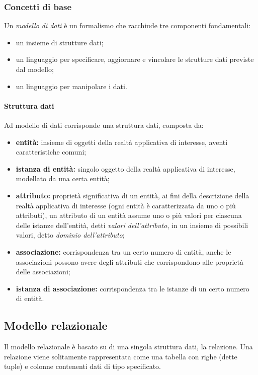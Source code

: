 \subsubsection{Concetti di base}%
\label{ssub:Concetti di base}
Un \emph{modello di dati} è un formalismo che racchiude tre componenti
fondamentali:
\begin{itemize}
  \item un insieme di strutture dati;
  \item un linguaggio per specificare, aggiornare e vincolare le strutture dati
    previste dal modello;
  \item un linguaggio per manipolare i dati.
\end{itemize}

\paragraph{Struttura dati}%
\label{par:Struttura dati}
Ad modello di dati corrisponde una struttura dati, composta da:
\begin{itemize}
  \item \textbf{entità:} insieme di oggetti della realtà applicativa di
    interesse, aventi caratteristiche comuni;
  \item \textbf{istanza di entità:} singolo oggetto della realtà applicativa di
    interesse, modellato da una certa entità;
  \item \textbf{attributo:} proprietà significativa di un entità, ai fini della
    descrizione della realtà applicativa di interesse (ogni entità è
    caratterizzata da uno o più attributi), un attributo di un entità assume uno
    o più valori per ciascuna delle istanze dell'entità, detti \textit{valori
    dell'attributo}, in un insieme di possibili valori, detto \textit{dominio
    dell'attributo};
  \item \textbf{associazione:} corrispondenza tra un certo numero di entità,
    anche le associazioni possono avere degli attributi che corrispondono alle
    proprietà delle associazioni;
  \item \textbf{istanza di associazione:} corrispondenza tra le istanze di un
    certo numero di entità.
\end{itemize}

\subsection{Modello relazionale}%
\label{par:Modello relazionale}
Il modello relazionale è basato su di una singola struttura dati, la relazione.
Una relazione viene solitamente rappresentata come una tabella con righe (dette
tuple) e colonne contenenti dati di tipo specificato.

